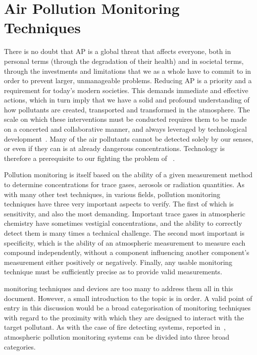 
\section{Air Pollution Monitoring Techniques}%
\label{sec:intro_air_pollution_monitoring_techniques}

There is no doubt that \gls{AP} is a global threat that affects
everyone, both in personal terms (through the degradation of their
health) and in societal terms, through the investments and limitations
that we as a whole have to commit to in order to prevent larger,
unmanageable problems. Reducing \gls{AP} is a priority and a requirement
for today's modern societies. This demands immediate and effective
actions, which in turn imply that we have a solid and profound
understanding of how pollutants are created, transported and transformed
in the atmosphere. The scale on which these interventions must be
conducted requires them to be made on a concerted and collaborative
manner, and always leveraged by technological
development~\cite{EEA2019}. Many of the air pollutants cannot be
detected solely by our senses, or even if they can is at already
dangerous concentrations. Technology is therefore a prerequisite to our
fighting the problem of ~\cite{Vallero2014}.

Pollution monitoring is itself based on the ability of a given
measurement method to determine concentrations for trace gases, aerosols
or radiation quantities. As with many other test techniques, in various
fields, pollution monitoring techniques have three very important
aspects to verify. The first of which is sensitivity, and also the most
demanding. Important trace gases in atmospheric chemistry have sometimes
vestigial concentrations, and the ability to correctly detect them is
many times a technical challenge. The second most important is
specificity, which is the ability of an atmospheric measurement to
measure each compound independently, without a component influencing
another component's measurement either positively or negatively.
Finally, any usable monitoring technique must be sufficiently precise as
to provide valid measurements.

 monitoring techniques and devices are too many to address
them all in this document. However, a small introduction to the topic is
in order. A valid point of entry in this discussion would be a broad
categorisation of monitoring techniques with regard to the proximity
with which they are designed to interact with the target pollutant.
As with the case of fire detecting systems, reported
in~\cite{ValentedeAlmeida2017}, atmospheric pollution monitoring systems
can be divided into three broad categories.

